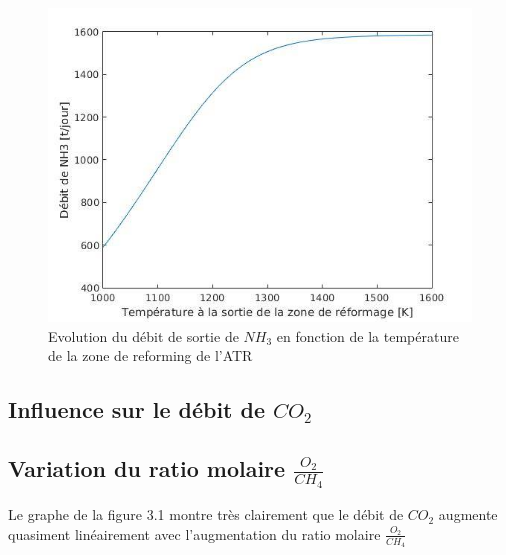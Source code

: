 \documentclass[12pt]{report}
\begin{document}
\begin{figure}[H]
\begin{center}
\includegraphics[scale=0.6]{debit_NH3_Temperature}
\caption{Evolution du débit de sortie de $NH_3$ en fonction de la température de la zone de reforming de l'ATR}
\end{center}
\end{figure}



\textcolor{carmine}{\chapter{Influence sur le débit de $CO_2$}}

\section{Variation du ratio molaire $\frac{O_2}{CH_4}$}

Le graphe de la figure 3.1 montre très clairement que le débit de $CO_2$ augmente quasiment linéairement avec l'augmentation du ratio molaire $\frac{O_2}{CH_4}$
\end{document}
